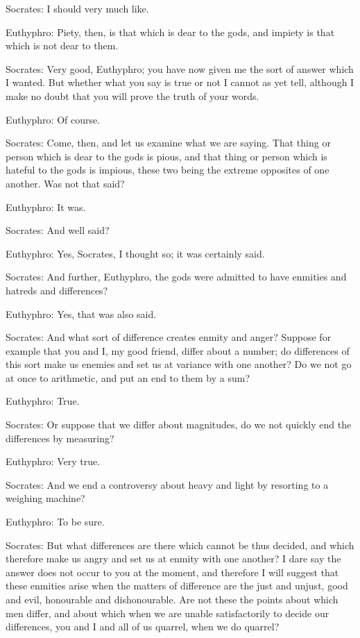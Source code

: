 Socrates: I should very much like.

Euthyphro: Piety, then, is that which is dear to the gods, and impiety is that which is not dear to them.

Socrates: Very good, Euthyphro; you have now given me the sort of answer which I wanted. But whether what you say is true or not I cannot as yet tell, although I make no doubt that you will prove the truth of your words.

Euthyphro: Of course.

Socrates: Come, then, and let us examine what we are saying. That thing or person which is dear to the gods is pious, and that thing or person which is hateful to the gods is impious, these two being the extreme opposites of one another. Was not that said?

Euthyphro: It was.

Socrates: And well said?

Euthyphro: Yes, Socrates, I thought so; it was certainly said.

Socrates: And further, Euthyphro, the gods were admitted to have enmities and hatreds and differences?

Euthyphro: Yes, that was also said.

Socrates: And what sort of difference creates enmity and anger? Suppose for example that you and I, my good friend, differ about a number; do differences of this sort make us enemies and set us at variance with one another? Do we not go at once to arithmetic, and put an end to them by a sum?

Euthyphro: True.

Socrates: Or suppose that we differ about magnitudes, do we not quickly end the differences by measuring?

Euthyphro: Very true.

Socrates: And we end a controversy about heavy and light by resorting to a weighing machine?

Euthyphro: To be sure.

Socrates: But what differences are there which cannot be thus decided, and which therefore make us angry and set us at enmity with one another? I dare say the answer does not occur to you at the moment, and therefore I will suggest that these enmities arise when the matters of difference are the just and unjust, good and evil, honourable and dishonourable. Are not these the points about which men differ, and about which when we are unable satisfactorily to decide our differences, you and I and all of us quarrel, when we do quarrel?

